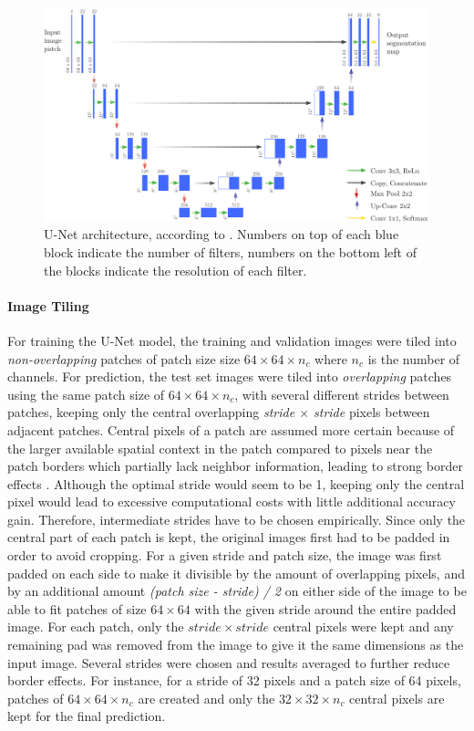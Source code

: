 \documentclass[10pt]{article}
\begin{document}
\begin{figure}[H]
    \centering
    \includegraphics[width=\textwidth]{Schema/unet}
    \caption{U-Net architecture, according to \textcite{ronneberger2015u}. Numbers on top of each blue block indicate the number of filters, numbers on the bottom left of the blocks indicate the resolution of each filter. } 
    \label{fig:u-net}
\end{figure}

\paragraph{Image Tiling} For training the U-Net model, the training and validation images were tiled into \textit{non-overlapping} patches of patch size size $64 \times 64 \times n_c$ where $n_c$ is the number of channels. For prediction, the test set images were tiled into \textit{overlapping} patches using the same patch size of $64 \times 64 \times n_c$, with several different strides between patches, keeping only the central overlapping \textit{stride $\times$ stride} pixels between adjacent patches. Central pixels of a patch are assumed more certain because of the larger available spatial context in the patch compared to pixels near the patch borders which partially lack neighbor information, leading to strong border effects \cite{Marmanis2016SemanticSO}. Although the optimal stride would seem to be 1, keeping only the central pixel would lead to excessive computational costs with little additional accuracy gain. Therefore, intermediate strides have to be chosen empirically. Since only the central part of each patch is kept, the original images first had to be padded in order to avoid cropping. For a given stride and patch size, the image was first padded on each side to make it divisible by the amount of overlapping pixels, and by an additional amount \textit{(patch size - stride) / 2} on either side of the image to be able to fit patches of size $64 \times 64$ with the given stride around the entire padded image. For each patch, only the $stride \times stride$ central pixels were kept and any remaining pad was removed from the image to give it the same dimensions as the input image. Several strides were chosen and results averaged to further reduce border effects. For instance, for a stride of 32 pixels and a patch size of 64 pixels, patches of $64 \times 64 \times n_c$ are created and only the $32 \times 32 \times n_c$ central pixels are kept for the final prediction.
\end{document}
